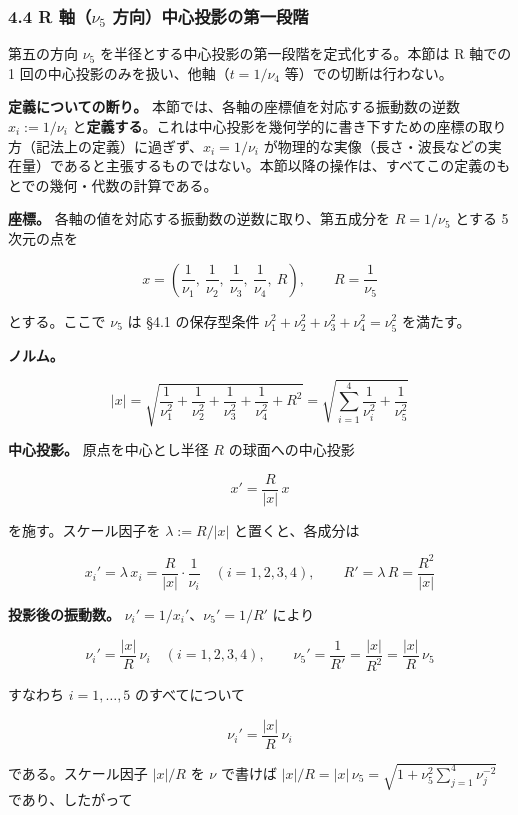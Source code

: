 \documentclass[
]{ltjsarticle}
\begin{document}
\subsubsection{\texorpdfstring{4.4 R 軸（\(\nu_5\)
方向）中心投影の第一段階}{4.4 R 軸（\textbackslash nu\_5 方向）中心投影の第一段階}}\label{r-ux8ef8nu_5-ux65b9ux5411ux4e2dux5fc3ux6295ux5f71ux306eux7b2cux4e00ux6bb5ux968e}

第五の方向 \(\nu_5\) を半径とする中心投影の第一段階を定式化する。本節は
R 軸での 1 回の中心投影のみを扱い、他軸（\(t=1/\nu_4\)
等）での切断は行わない。

\textbf{定義についての断り。}
本節では、各軸の座標値を対応する振動数の逆数 \(x_i:=1/\nu_i\)
と\textbf{定義する}。これは中心投影を幾何学的に書き下すための座標の取り方（記法上の定義）に過ぎず、\(x_i=1/\nu_i\)
が物理的な実像（長さ・波長などの実在量）であると主張するものではない。本節以降の操作は、すべてこの定義のもとでの幾何・代数の計算である。

\textbf{座標。} 各軸の値を対応する振動数の逆数に取り、第五成分を
\(R=1/\nu_5\) とする 5 次元の点を

\[x = \left(\frac{1}{\nu_1},\ \frac{1}{\nu_2},\ \frac{1}{\nu_3},\ \frac{1}{\nu_4},\ R\right),\qquad R=\frac{1}{\nu_5}\]

とする。ここで \(\nu_5\) は §4.1 の保存型条件
\(\nu_1^2+\nu_2^2+\nu_3^2+\nu_4^2=\nu_5^2\) を満たす。

\textbf{ノルム。}

\[|x| = \sqrt{\frac{1}{\nu_1^2}+\frac{1}{\nu_2^2}+\frac{1}{\nu_3^2}+\frac{1}{\nu_4^2}+R^2} = \sqrt{\sum_{i=1}^{4}\frac{1}{\nu_i^2}+\frac{1}{\nu_5^2}}\]

\textbf{中心投影。} 原点を中心とし半径 \(R\) の球面への中心投影

\[x' = \frac{R}{|x|}\,x\]

を施す。スケール因子を \(\lambda := R/|x|\) と置くと、各成分は

\[x_i' = \lambda\,x_i = \frac{R}{|x|}\cdot\frac{1}{\nu_i}\quad(i=1,2,3,4),\qquad R' = \lambda\,R = \frac{R^2}{|x|}\]

\textbf{投影後の振動数。} \(\nu_i'=1/x_i'\)、\(\nu_5'=1/R'\) により

\[\nu_i' = \frac{|x|}{R}\,\nu_i\quad(i=1,2,3,4),\qquad \nu_5' = \frac{1}{R'} = \frac{|x|}{R^2} = \frac{|x|}{R}\,\nu_5\]

すなわち \(i=1,\dots,5\) のすべてについて

\[\nu_i' = \frac{|x|}{R}\,\nu_i\]

である。スケール因子 \(|x|/R\) を \(\nu\) で書けば
\(|x|/R = |x|\,\nu_5 = \sqrt{1+\nu_5^2\sum_{j=1}^{4}\nu_j^{-2}}\)
であり、したがって
\end{document}
